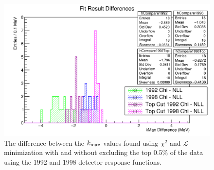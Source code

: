 \begin{figure}[h]
  \centering
  \includegraphics[width=0.7\linewidth]{figures/png/compare_fit_results_92_v_98_with_topCut.png}
  \caption{The difference between the $\mbox{$k_{\rm max}$}$ values found using $\chi^2$ and
    $\mathcal{L}$ minimization with and without excluding the top 0.5\% of the data
    using the 1992 and 1998 detector response functions.}
  \label{fig:compareFitsTopCut}
\end{figure}





